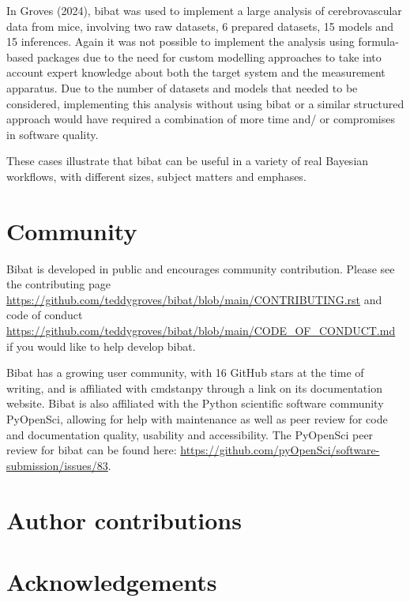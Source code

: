 \documentclass[
  letterpaper,
  DIV=11,
  numbers=noendperiod]{scrartcl}
\begin{document}
In Groves (2024), bibat was used to implement a large analysis of
cerebrovascular data from mice, involving two raw datasets, 6 prepared
datasets, 15 models and 15 inferences. Again it was not possible to
implement the analysis using formula-based packages due to the need for
custom modelling approaches to take into account expert knowledge about
both the target system and the measurement apparatus. Due to the number
of datasets and models that needed to be considered, implementing this
analysis without using bibat or a similar structured approach would have
required a combination of more time and/ or compromises in software
quality.

These cases illustrate that bibat can be useful in a variety of real
Bayesian workflows, with different sizes, subject matters and emphases.

\section{Community}\label{community}

Bibat is developed in public and encourages community contribution.
Please see the contributing page
\url{https://github.com/teddygroves/bibat/blob/main/CONTRIBUTING.rst}
and code of conduct
\url{https://github.com/teddygroves/bibat/blob/main/CODE_OF_CONDUCT.md}
if you would like to help develop bibat.

Bibat has a growing user community, with 16 GitHub stars at the time of
writing, and is affiliated with cmdstanpy through a link on its
documentation website. Bibat is also affiliated with the Python
scientific software community PyOpenSci, allowing for help with
maintenance as well as peer review for code and documentation quality,
usability and accessibility. The PyOpenSci peer review for bibat can be
found here:
\url{https://github.com/pyOpenSci/software-submission/issues/83}.

\section{Author contributions}\label{author-contributions}

\section*{Acknowledgements}\label{acknowledgements}
\end{document}
